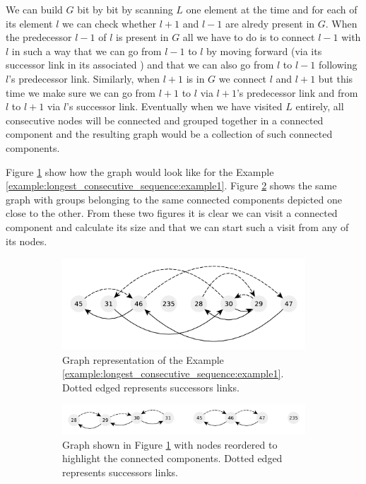 We can build $G$ bit by bit by scanning $L$ one element at the time and for each of its element $l$ we can check whether $l+1$ and $l-1$ are alredy present in $G$. 
When the predecessor $l-1$ of $l$ is present in $G$ all we have to do is to connect $l-1$ with $l$ in such a way that we can go from $l-1$ to $l$ by moving forward (via its successor link in its associated ) and that we can also go from $l$ to $l-1$ following $l$'s predecessor link.
Similarly, when $l+1$ is in $G$ we connect $l$ and $l+1$ but this time we make sure we can go from $l+1$ to $l$ via $l+1$'s predecessor link and from $l$ to $l+1$ via $l$'s successor link.
Eventually when we have visited $L$ entirely, all consecutive nodes will be connected and grouped together in a connected component and the resulting graph would be a collection of such connected components. 

Figure \ref{fig:longest_consecutive_sequence:graph_example1} show how the graph would look like for the Example \ref{example:longest_consecutive_sequence:example1}. Figure \ref{fig:longest_consecutive_sequence:graph_example1_1} shows the same graph with groups belonging to the same connected components depicted one close to the other.
From these two figures it is clear we can visit a connected component and calculate its size and that we can start such a visit from any of  its nodes.  

\begin{figure}
	\centering
	\begin{subfigure}[t]{0.99\textwidth}
		\includegraphics[width=1\linewidth]{sources/longest_consecutive_sequence/images/example_graph1}
		\caption{Graph representation of the Example \ref{example:longest_consecutive_sequence:example1}. Dotted edged represents successors links.}
		\label{fig:longest_consecutive_sequence:graph_example1}
	 \end{subfigure}
	\hfill
	\begin{subfigure}[t]{0.99\textwidth}
		\includegraphics[width=1\linewidth]{sources/longest_consecutive_sequence/images/example_graph1_1}
		\caption{Graph shown in Figure \ref{fig:longest_consecutive_sequence:graph_example1} with nodes reordered to highlight the connected components.
		Dotted edged represents successors links.}
		\label{fig:longest_consecutive_sequence:graph_example1_1}
	 \end{subfigure}
	 \caption[]{}
	  \label{}
\end{figure}


